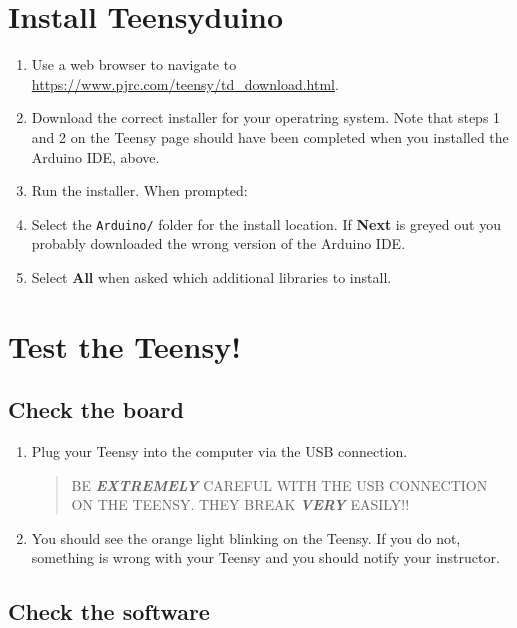 \documentclass[]{book}
\providecommand{\tightlist}{%
  \setlength{\itemsep}{0pt}\setlength{\parskip}{0pt}}
\begin{document}
\hypertarget{install-teensyduino}{%
\section{Install Teensyduino}\label{install-teensyduino}}

\begin{enumerate}
\def\labelenumi{\arabic{enumi}.}
\tightlist
\item
  Use a web browser to navigate to \url{https://www.pjrc.com/teensy/td_download.html}.
\item
  Download the correct installer for your operatring system. Note that steps 1 and 2 on the Teensy page should have been completed when you installed the Arduino IDE, above.
\item
  Run the installer. When prompted:
\item
  Select the \texttt{Arduino/} folder for the install location. If \textbf{Next} is greyed out you probably downloaded the wrong version of the Arduino IDE.
\item
  Select \textbf{All} when asked which additional libraries to install.
\end{enumerate}

\hypertarget{test-the-teensy}{%
\section{Test the Teensy!}\label{test-the-teensy}}

\hypertarget{check-the-board}{%
\subsection{Check the board}\label{check-the-board}}

\begin{enumerate}
\def\labelenumi{\arabic{enumi}.}
\item
  Plug your Teensy into the computer via the USB connection.

  \begin{quote}
  BE \textbf{\emph{EXTREMELY}} CAREFUL WITH THE USB CONNECTION ON THE TEENSY. THEY BREAK \textbf{\emph{VERY}} EASILY!!
  \end{quote}
\item
  You should see the orange light blinking on the Teensy. If you do not, something is wrong with your Teensy and you should notify your instructor.
\end{enumerate}

\hypertarget{check-the-software}{%
\subsection{Check the software}\label{check-the-software}}
\end{document}
